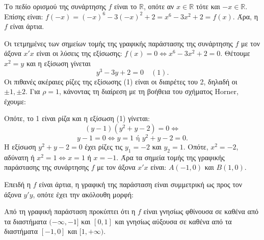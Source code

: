 \documentclass[11pt,a4paper,twoside]{book}
\begin{document}
\begin{alist}
\item Το πεδίο ορισμού της συνάρτησης $f$ είναι το $\mathbb{R}$, οπότε αν $x \in \mathbb{R}$ τότε και $-x \in \mathbb{R}$.
Επίσης είναι: $f(-x) = (-x)^6 - 3(-x)^2 + 2 = x^6 - 3x^2 + 2 = f(x)$.
Άρα, η $f$ είναι άρτια.
\item Οι τετμημένες των σημείων τομής της γραφικής παράστασης της συνάρτησης $f$ με τον άξονα $x'x$ είναι οι λύσεις της εξίσωσης: $f(x) = 0 \Leftrightarrow x^6 - 3x^2 + 2 = 0$.
Θέτουμε $x^2 = y$ και η εξίσωση γίνεται
\[y^3 - 3y + 2 = 0 \quad (1).\]
Οι πιθανές ακέραιες ρίζες της εξίσωσης (1) είναι οι διαιρέτες του 2, δηλαδή οι $\pm 1, \pm 2$. Για $\rho = 1$, κάνοντας τη διαίρεση με τη βοήθεια του σχήματος Horner, έχουμε:
\begin{center}
\end{center}
Οπότε, το 1 είναι ρίζα και η εξίσωση (1) γίνεται:
\[(y - 1)(y^2 + y - 2) = 0 \Leftrightarrow\]
\[y - 1 = 0 \Leftrightarrow y = 1 \text{ ή } y^2 + y - 2 = 0.\]
Η εξίσωση $y^2 + y - 2 = 0$ έχει ρίζες τις $y_1 = -2$ και $y_2 = 1$.
Οπότε, $x^2 = -2$, αδύνατη ή $x^2 = 1 \Leftrightarrow x = 1$ ή $x = -1$.
Άρα τα σημεία τομής της γραφικής παράστασης της συνάρτησης $f$ με τον άξονα $x'x$ είναι: $A(-1, 0)$ και $B(1, 0)$.
\item Επειδή η $f$ είναι άρτια, η γραφική της παράσταση είναι συμμετρική ως προς τον άξονα $y'y$, οπότε έχει την ακόλουθη μορφή:
\begin{center}
\end{center}
\item Από τη γραφική παράσταση προκύπτει ότι η $f$ είναι γνησίως φθίνουσα σε καθένα από τα διαστήματα $(-\infty, -1]$ και $[0, 1]$ και γνησίως αύξουσα σε καθένα από τα διαστήματα $[-1, 0]$ και $[1, +\infty)$.
\end{alist}
\end{document}
